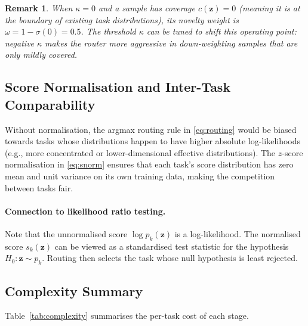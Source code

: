 \documentclass[12pt,a4paper]{article}
\newtheorem{remark}{Remark}
\begin{document}
\begin{remark}
When $\kappa = 0$ and a sample has coverage $c(\mathbf{z}) = 0$ (meaning it is at the boundary of existing task distributions), its novelty weight is $\omega = 1 - \sigma(0) = 0.5$. The threshold $\kappa$ can be tuned to shift this operating point: negative $\kappa$ makes the router more aggressive in down-weighting samples that are only mildly covered.
\end{remark}

\subsection{Score Normalisation and Inter-Task Comparability}

Without normalisation, the argmax routing rule in \eqref{eq:routing} would be biased towards tasks whose distributions happen to have higher absolute log-likelihoods (e.g., more concentrated or lower-dimensional effective distributions).
The $z$-score normalisation in \eqref{eq:snorm} ensures that each task's score distribution has zero mean and unit variance on its own training data, making the competition between tasks fair.

\paragraph{Connection to likelihood ratio testing.}
Note that the unnormalised score $\log p_k(\mathbf{z})$ is a log-likelihood.
The normalised score $s_k(\mathbf{z})$ can be viewed as a standardised test statistic for the hypothesis $H_0: \mathbf{z} \sim p_k$.
Routing then selects the task whose null hypothesis is least rejected.

\subsection{Complexity Summary}

Table~\ref{tab:complexity} summarises the per-task cost of each stage.
\end{document}
